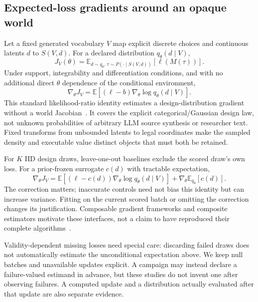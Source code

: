 \subsection{Expected-loss gradients around an opaque world}
Let a fixed generated vocabulary $V$ map explicit discrete choices and continuous
latents $ d $ to $S(V,d)$. For a declared distribution $ q_\theta(d\mid V)$,
\begin{equation}
 J_V(\theta)=\mathbb E_{d\sim q_\theta,\,\tau\sim P(\cdot\mid S(V,d))}
 [\ell(M(\tau))].
\end{equation}
Under support, integrability and differentiation conditions, and with no
additional direct $\theta $ dependence of the conditional environment,
\begin{equation}
 \nabla_\theta J_V
 =\mathbb E[(\ell-b)\nabla_\theta\log q_\theta(d\mid V)].
 \label{eq:integrated-score}
\end{equation}
This standard likelihood-ratio identity estimates a design-distribution
gradient without a world Jacobian~\citep{parmas2021unified}. It covers the
explicit categorical/Gaussian design law, not unknown probabilities of arbitrary
LLM source synthesis or researcher text. Fixed transforms from unbounded
latents to legal coordinates make the sampled density and executable value
distinct objects that must both be retained.

For $K$ IID design draws, leave-one-out baselines exclude the scored draw's
own loss. For a prior-frozen surrogate $ c(d)$ with tractable expectation,
\begin{equation}
 \nabla_\theta J_V
 =\mathbb E[(\ell-c(d))\nabla_\theta\log q_\theta(d\mid V)]
  +\nabla_\theta\mathbb E_{q_\theta}[c(d)].
 \label{eq:integrated-control}
\end{equation}
The correction matters; inaccurate controls need not bias this identity but
can increase variance. Fitting on the current scored batch or omitting the
correction changes its justification. Composable gradient frameworks and
composite estimators motivate these interfaces, not a claim to have reproduced
their complete algorithms~\citep{parmas2022proppo,parmas2023composite}.

Validity-dependent missing losses need special care: discarding failed draws
does not automatically estimate the unconditional expectation above. We keep
null batches and unavailable updates explicit. A campaign may instead declare
a failure-valued estimand in advance, but these studies do not invent one after
observing failures. A computed update and a distribution actually evaluated
after that update are also separate evidence.

